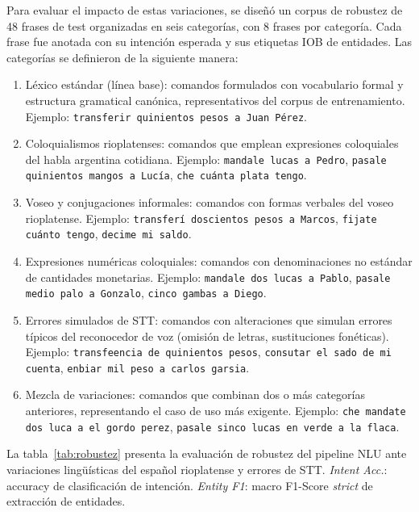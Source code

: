 Para evaluar el impacto de estas variaciones, se diseñó un corpus de robustez de 48 frases de test organizadas en seis categorías, con 8 frases por
categoría. Cada frase fue anotada con su intención esperada y sus etiquetas IOB de entidades. Las categorías se definieron de la siguiente manera:

\begin{enumerate}
    \item Léxico estándar (línea base): comandos formulados con vocabulario formal y estructura gramatical canónica, representativos
    del corpus de entrenamiento. Ejemplo: \texttt{transferir quinientos pesos a Juan Pérez}.

    \item Coloquialismos rioplatenses: comandos que emplean expresiones coloquiales del habla argentina cotidiana. Ejemplo: \texttt{mandale
    lucas a Pedro}, \texttt{pasale quinientos mangos a Lucía}, \texttt{che cuánta plata tengo}.

    \item Voseo y conjugaciones informales: comandos con formas verbales del voseo rioplatense. Ejemplo: \texttt{transferí doscientos pesos a
    Marcos}, \texttt{fijate cuánto tengo}, \texttt{decime mi saldo}.

    \item Expresiones numéricas coloquiales: comandos con denominaciones no estándar de cantidades monetarias. Ejemplo: \texttt{mandale
    dos lucas a Pablo}, \texttt{pasale medio palo a Gonzalo}, \texttt{cinco gambas a Diego}.

    \item Errores simulados de STT: comandos con alteraciones que simulan errores típicos del reconocedor de voz (omisión de letras,
    sustituciones fonéticas). Ejemplo: \texttt{transfeencia de quinientos pesos}, \texttt{consutar el sado de mi cuenta}, \texttt{enbiar mil peso a carlos garsia}.

    \item Mezcla de variaciones: comandos que combinan dos o más categorías anteriores, representando el caso de uso más exigente.
    Ejemplo: \texttt{che mandate dos luca a \allowbreak{} el gordo perez},
    \texttt{pasale sinco lucas en verde a la flaca}.
\end{enumerate}

La tabla~\ref{tab:robustez} presenta la evaluación de robustez del pipeline NLU ante variaciones lingüísticas
         del español rioplatense y errores de STT. \textit{Intent Acc.}:
         accuracy de clasificación de intención. \textit{Entity F1}: macro
         F1-Score \textit{strict} de extracción de entidades.

